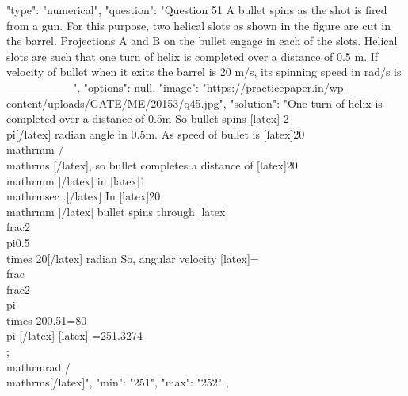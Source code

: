   {
    "type": "numerical",
    "question": "Question 51 A bullet spins as the shot is fired from a gun. For this purpose, two helical slots as shown in the figure are cut in the barrel. Projections A and B on the bullet engage in each of the slots. Helical slots are such that one turn of helix is completed over a distance of 0.5 m. If velocity of bullet when it exits the barrel is 20 m/s, its spinning speed in rad/s is ________",
    "options": null,
    "image": "https://practicepaper.in/wp-content/uploads/GATE/ME/20153/q45.jpg",
    "solution": "One turn of helix is completed over a distance of 0.5m So bullet spins [latex] 2 \\pi[/latex] radian angle in 0.5m. As speed of bullet is [latex]20 \\mathrm{m} / \\mathrm{s} [/latex], so bullet completes a distance of [latex]20 \\mathrm{m} [/latex] in [latex]1 \\mathrm{sec} .[/latex] In [latex]20 \\mathrm{m} [/latex] bullet spins through [latex]\\frac{2 \\pi}{0.5} \\times 20[/latex] radian So, angular velocity [latex]=\\frac{\\frac{2 \\pi \\times 20}{0.5}}{1}=80 \\pi [/latex] [latex] =251.3274 \\;\\mathrm{rad} / \\mathrm{s}[/latex]",
    "min": "251",
    "max": "252"
  },
